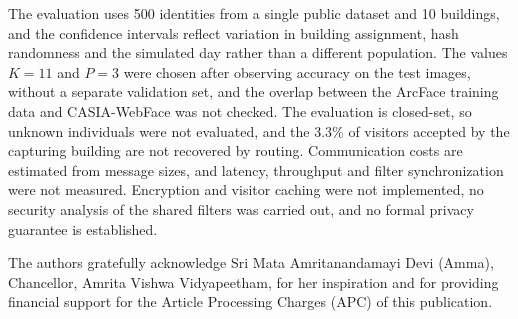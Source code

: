 \documentclass[pdflatex,sn-mathphys-num]{sn-jnl}%
\theoremstyle{thmstyleone}%
\theoremstyle{thmstyletwo}%
\theoremstyle{thmstylethree}%
\begin{document}
The evaluation uses 500 identities from a single public dataset and 10 buildings, and the confidence intervals reflect variation in building assignment, hash randomness and the simulated day rather than a different population. The values $K=11$ and $P=3$ were chosen after observing accuracy on the test images, without a separate validation set, and the overlap between the ArcFace training data and CASIA-WebFace was not checked. The evaluation is closed-set, so unknown individuals were not evaluated, and the 3.3\% of visitors accepted by the capturing building are not recovered by routing. Communication costs are estimated from message sizes, and latency, throughput and filter synchronization were not measured. Encryption and visitor caching were not implemented, no security analysis of the shared filters was carried out, and no formal privacy guarantee is established.


The authors gratefully acknowledge Sri Mata Amritanandamayi Devi (Amma), Chancellor, Amrita Vishwa Vidyapeetham, for her inspiration and for providing financial support for the Article Processing Charges (APC) of this publication.

\end{document}
